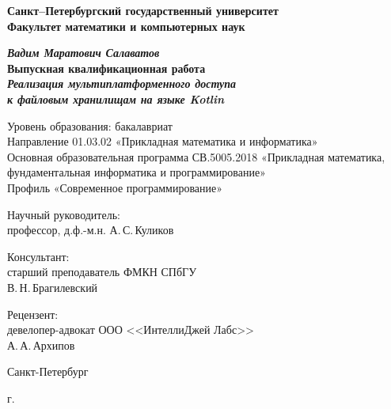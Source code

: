 \begin{titlepage}
\begin{center}

\textbf{Санкт--Петербургский государственный университет}\\
\textbf{Факультет математики и компьютерных наук}


\vspace{35mm}

\textbf{\textit{\large Вадим Маратович Салаватов}} \\[8mm]
\textbf{\large Выпускная квалификационная работа}\\[3mm]
\textbf{\textit{\large Реализация мультиплатформенного доступа\\ к файловым хранилищам на языке Kotlin}}

\vspace{20mm}
Уровень образования: бакалавриат\\
Направление 01.03.02 «Прикладная математика и информатика»\\
Основная образовательная программа СВ.5005.2018
«Прикладная математика, фундаментальная информатика и программирование»\\
Профиль «Современное программирование»\\[16mm]


\begin{flushright}
\begin{minipage}[t]{0.65\textwidth}
{Научный руководитель:} \\
профессор, д.ф.-м.н. А.\,С.\,Куликов
\vspace{4mm}

{Консультант:} \\
старший преподаватель ФМКН СПбГУ\\
В.\,Н.\,Брагилевский
\vspace{4mm}

{Рецензент:} \\
девелопер-адвокат ООО <<ИнтеллиДжей Лабс>>\\ А.\,А.\,Архипов
\end{minipage}
\end{flushright}

\vfill

{Санкт-Петербург}
\par{\the\year{} г.}
\end{center}
\end{titlepage}
\restoregeometry
\addtocounter{page}{1}
